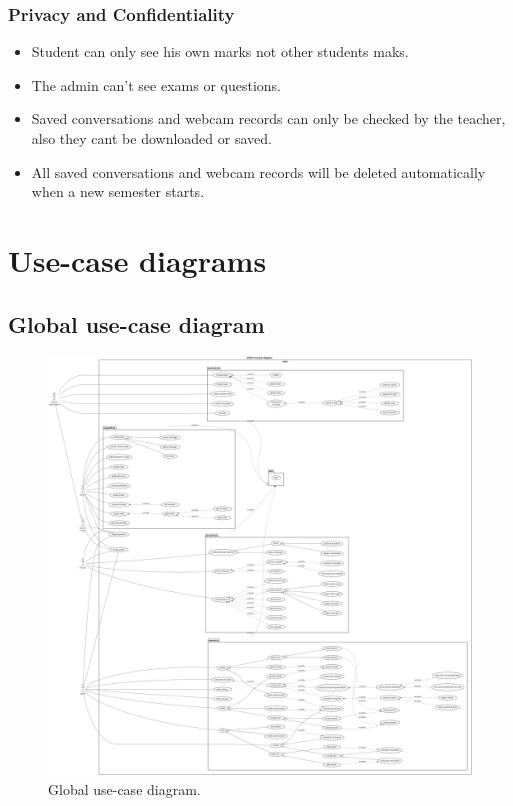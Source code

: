 \documentclass[]{uc2pfecaneva}
\begin{document}
\raggedright\subsubsection{Privacy and Confidentiality}
\begin{itemize}
	\item Student can only see his own marks not other students maks.
	\item The admin can’t see exams or questions.
	\item Saved conversations and webcam records can only be checked by the teacher, also they cant be downloaded or saved.
	\item All saved conversations and webcam records will be deleted automatically when a new semester starts.
\end{itemize}
\raggedright\section{Use-case diagrams}
\subsection{Global use-case diagram}

     \begin{figure}[ht]
	
	\centering
	\includegraphics[width=\textwidth]{images/GUCD}
	
	\caption{Global use-case diagram.}
	\end{figure}
\clearpage
\end{document}
